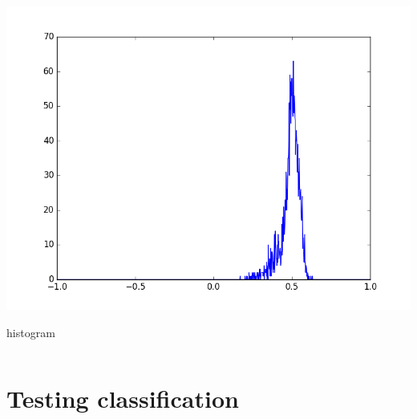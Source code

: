 \documentclass[c]{beamer}
\begin{document}
\begin{frame}
{\begin{columns}
\begin{column}{0.12\textwidth}
\begin{overlayarea}{\linewidth}{1.3cm}
    \centering\vfill
    \includegraphics[scale=0.07]{images/Porri/08_ndvi_histo.png}
  \end{overlayarea}
  \begin{overlayarea}{\linewidth}{0.5cm}
    \centering
    \tiny histogram \par
  \end{overlayarea}
 \end{column}
 
 
\end{columns}
}
\end{frame}




\section{Testing classification}
\end{document}
